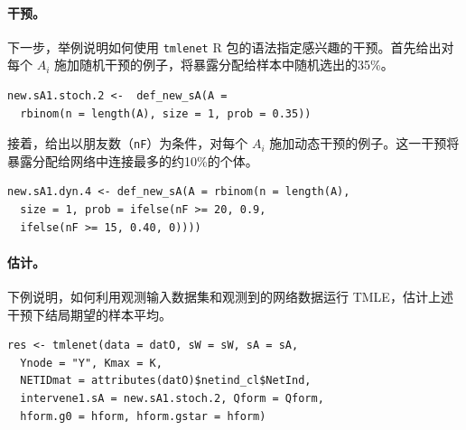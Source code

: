 \paragraph{干预。}
下一步，举例说明如何使用 \texttt{tmlenet} R 包的语法指定感兴趣的干预。首先给出对每个 $A_i$ 施加随机干预的例子，将暴露分配给样本中随机选出的35\%。
\par\noindent\begin{minipage}{\linewidth}
\begin{lstlisting}[numbers=none,frame=none]
new.sA1.stoch.2 <-  def_new_sA(A =
  rbinom(n = length(A), size = 1, prob = 0.35))
\end{lstlisting}
\end{minipage}\par
接着，给出以朋友数（\texttt{nF}）为条件，对每个 $A_i$ 施加动态干预的例子。这一干预将暴露分配给网络中连接最多的约10\%的个体。
\par\noindent\begin{minipage}{\linewidth}
\begin{lstlisting}[numbers=none,frame=none]
new.sA1.dyn.4 <- def_new_sA(A = rbinom(n = length(A),
  size = 1, prob = ifelse(nF >= 20, 0.9,
  ifelse(nF >= 15, 0.40, 0))))
\end{lstlisting}
\end{minipage}\par

\paragraph{估计。}
下例说明，如何利用观测输入数据集和观测到的网络数据运行 TMLE，估计上述干预下结局期望的样本平均。
\par\noindent\begin{minipage}{\linewidth}
\begin{lstlisting}[numbers=none,frame=none]
res <- tmlenet(data = datO, sW = sW, sA = sA,
  Ynode = "Y", Kmax = K,
  NETIDmat = attributes(datO)$netind_cl$NetInd,
  intervene1.sA = new.sA1.stoch.2, Qform = Qform,
  hform.g0 = hform, hform.gstar = hform)
\end{lstlisting}
\end{minipage}\par
